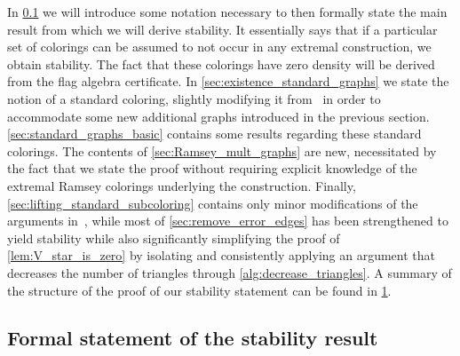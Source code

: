 \documentclass[a4paper,11pt]{article}
\numberwithin{equation}{section}
\begin{document}
In \cref{sec:formal_statement_theorem} we will introduce some notation necessary to then formally state the main result from which we will derive stability. It essentially says that if a particular set of colorings can be assumed to not occur in any extremal construction, we obtain stability. The fact that these colorings have zero density will be derived from the flag algebra certificate. In \cref{sec:existence_standard_graphs} we state the notion of a standard coloring, slightly modifying it from~\cite{CummingsEtAl_2013} in order to accommodate some new additional graphs introduced in the previous section. 
 \cref{sec:standard_graphs_basic} contains some results regarding these standard colorings.
 The contents of \cref{sec:Ramsey_mult_graphs} are new, necessitated by the fact that we state the proof without requiring explicit knowledge of the extremal Ramsey colorings underlying the construction. Finally, \cref{sec:lifting_standard_subcoloring} 
 contains only minor modifications of the arguments in~\cite{CummingsEtAl_2013},  while
 most of \cref{sec:remove_error_edges} has been strengthened to yield stability 
while also significantly simplifying the proof of \cref{lem:V_star_is_zero} by isolating and consistently applying an argument that decreases the number of triangles through \cref{alg:decrease_triangles}. A summary of the structure of the proof of our stability statement can be found in \cref{fig:proof_outline}.

\begin{figure}[omitted: a diagram of this paper's results, not reproduced here]\label{fig:proof_outline}\end{figure}

\subsection{Formal statement of the stability result}\label{sec:formal_statement_theorem}
\end{document}
